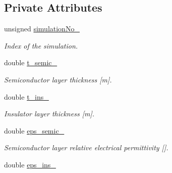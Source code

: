 \subsection*{Private Attributes}
\begin{DoxyCompactItemize}
\item 
\hypertarget{classParamsList_af9bb206ec2cb223298bf327f49a66dbb}{unsigned \hyperlink{classParamsList_af9bb206ec2cb223298bf327f49a66dbb}{simulation\-No\-\_\-}}\label{classParamsList_af9bb206ec2cb223298bf327f49a66dbb}

\begin{DoxyCompactList}\small\item\em Index of the simulation. \end{DoxyCompactList}\item 
\hypertarget{classParamsList_a6426d12d32a3ce5d29b3e07d0d38135e}{double \hyperlink{classParamsList_a6426d12d32a3ce5d29b3e07d0d38135e}{t\-\_\-semic\-\_\-}}\label{classParamsList_a6426d12d32a3ce5d29b3e07d0d38135e}

\begin{DoxyCompactList}\small\item\em Semiconductor layer thickness \mbox{[}m\mbox{]}. \end{DoxyCompactList}\item 
\hypertarget{classParamsList_a717b3f1de64266eaceab61126bef1a66}{double \hyperlink{classParamsList_a717b3f1de64266eaceab61126bef1a66}{t\-\_\-ins\-\_\-}}\label{classParamsList_a717b3f1de64266eaceab61126bef1a66}

\begin{DoxyCompactList}\small\item\em Insulator layer thickness \mbox{[}m\mbox{]}. \end{DoxyCompactList}\item 
\hypertarget{classParamsList_a7fa983e3f32d938c0cd7a484175e96d3}{double \hyperlink{classParamsList_a7fa983e3f32d938c0cd7a484175e96d3}{eps\-\_\-semic\-\_\-}}\label{classParamsList_a7fa983e3f32d938c0cd7a484175e96d3}

\begin{DoxyCompactList}\small\item\em Semiconductor layer relative electrical permittivity \mbox{[}\mbox{]}. \end{DoxyCompactList}\item 
\hypertarget{classParamsList_ab41bd9f20128245949cd8cb145041bac}{double \hyperlink{classParamsList_ab41bd9f20128245949cd8cb145041bac}{eps\-\_\-ins\-\_\-}}\label{classParamsList_ab41bd9f20128245949cd8cb145041bac}


\end{DoxyCompactItemize}
